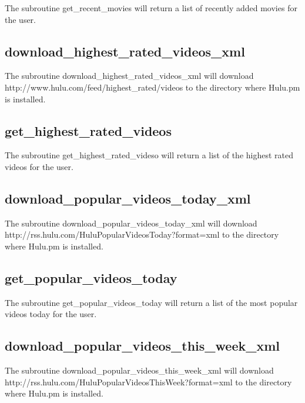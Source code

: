 The subroutine get\_recent\_movies will return a list of recently added movies for the user.

\subsection*{download\_highest\_rated\_videos\_xml\label{download_highest_rated_videos_xml}}


The subroutine download\_highest\_rated\_videos\_xml will download http://www.hulu.com/feed/highest\_rated/videos
to the directory where Hulu.pm is installed.

\subsection*{get\_highest\_rated\_videos\label{get_highest_rated_videos}}


The subroutine get\_highest\_rated\_videso will return a list of the highest rated videos for the user.

\subsection*{download\_popular\_videos\_today\_xml\label{download_popular_videos_today_xml}}


The subroutine download\_popular\_videos\_today\_xml will download http://rss.hulu.com/HuluPopularVideosToday?format=xml
to the directory where Hulu.pm is installed.

\subsection*{get\_popular\_videos\_today\label{get_popular_videos_today}}


The subroutine get\_popular\_videos\_today will return a list of the most popular videos today for the user.

\subsection*{download\_popular\_videos\_this\_week\_xml\label{download_popular_videos_this_week_xml}}


The subroutine download\_popular\_videos\_this\_week\_xml will download http://rss.hulu.com/HuluPopularVideosThisWeek?format=xml
to the directory where Hulu.pm is installed.

